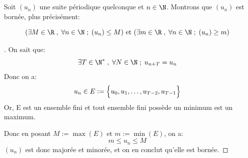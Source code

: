 \subsection[Toute suite périodique est bornée]{}

Soit \((u_n)\) une suite périodique quelconque et \(n \in \N\). Montrons que \((u_n)\) est bornée, plus précisément:

\[
   (\exists M \in \R \;,\; \forall n \in \N \; ; \; (u_n) \leq M) \text{ et } (\exists m \in \R \;,\; \forall n \in \N \; ; \; (u_n) \geq m)
\]

\begin{proof}[\unskip\nopunct]
   On sait que:
   \[
      \exists T \in \N^* \; , \; \forall N \in \N \; ; \; u_{n+T} = u_n
   \]
   Donc on a:
   \[
      u_n \in E:=\Bigl\{ u_0,u_1, \ldots,u_{T-2}, u_{T-1}\Bigl\}
   \]
   Or, E est un ensemble fini et tout ensemble fini possède un minimum est un maximum.

   Donc en posant \(M := \max(E)\) et \(m := \min(E)\), on a:
   \[
      m \leq u_n \leq M   
   \]
   \((u_n)\) est donc majorée et minorée, et on en conclut qu'elle est bornée.
\end{proof}
\pagebreak

\section[Exercices]{}
